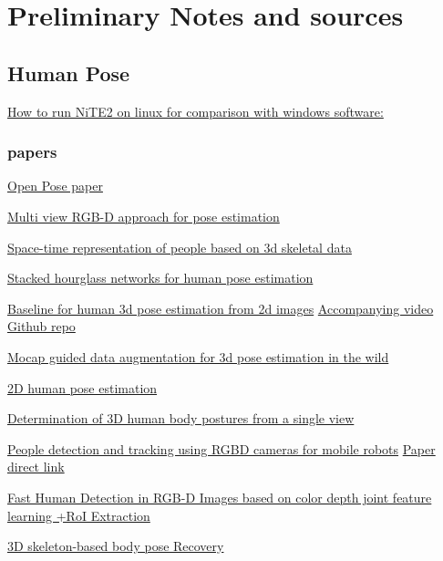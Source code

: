 \chapter{Preliminary Notes and sources}
\section{Human Pose}
\href{https://autostudentsite.wordpress.com/2017/05/18/running-and-building-nite2-samples-for-kinect-v2/}{How to run NiTE2 on linux for comparison with windows software:}

\subsection{papers}

\href{https://arxiv.org/pdf/1611.08050.pdf}{Open Pose paper}

\href{https://arxiv.org/pdf/1701.07372.pdf}{Multi view RGB-D approach for pose estimation}

\href{https://arxiv.org/pdf/1601.01006.pdf}{Space-time representation of people based on 3d skeletal data}

\href{https://arxiv.org/pdf/1603.06937.pdf}{Stacked hourglass networks for human pose estimation}

\href{https://arxiv.org/pdf/1705.03098.pdf}{Baseline for human 3d pose estimation from 2d images}
\href{https://www.youtube.com/watch?v=Hmi3Pd9x1BE&feature=youtu.be}{Accompanying video}
\href{https://github.com/una-dinosauria/3d-pose-baseline}{Github repo}

\href{https://arxiv.org/pdf/1607.02046.pdf}{Mocap guided data augmentation for 3d pose estimation in the wild}

\href{http://human-pose.mpi-inf.mpg.de/contents/andriluka14cvpr.pdf}{2D human pose estimation}

\href{https://www.sciencedirect.com/science/article/pii/0734189X85900945}{Determination of 3D human body postures from a single view}

\href{http://journals.sagepub.com/doi/full/10.1177/1729881416657746}{People detection and tracking using RGBD cameras for mobile robots}
\href{http://journals.sagepub.com/doi/pdf/10.1177/1729881416657746}{Paper direct link}

\href{http://media.cs.tsinghua.edu.cn/~imagevision/papers/\%5B2016\%5D0000266-HuZhan-ICIP2016.pdf}{Fast Human Detection in RGB-D Images based on color depth joint feature learning +RoI Extraction}

\href{https://hal.inria.fr/inria-00590212/file/3dpvt-skeleton.pdf}{3D skeleton-based body pose Recovery}

